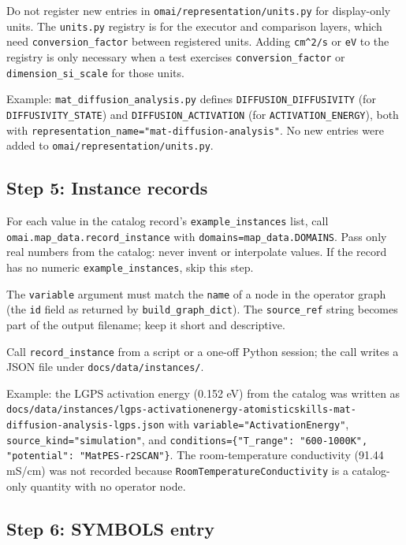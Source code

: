 \documentclass[11pt,a4paper]{article}
\begin{document}
Do not register new entries in \texttt{omai/representation/units.py} for
display-only units. The \texttt{units.py} registry is for the executor and
comparison layers, which need \texttt{conversion\_factor} between registered units.
Adding \texttt{cm\^{}2/s} or \texttt{eV} to the registry is only necessary when a
test exercises \texttt{conversion\_factor} or \texttt{dimension\_si\_scale} for
those units.

Example: \texttt{mat\_diffusion\_analysis.py} defines
\texttt{DIFFUSION\_DIFFUSIVITY} (for \texttt{DIFFUSIVITY\_STATE}) and
\texttt{DIFFUSION\_ACTIVATION} (for \texttt{ACTIVATION\_ENERGY}), both with
\texttt{representation\_name="mat-diffusion-analysis"}. No new entries were added to
\texttt{omai/representation/units.py}.

\subsection{Step 5: Instance records}

For each value in the catalog record's \texttt{example\_instances} list, call
\texttt{omai.map\_data.record\_instance} with \texttt{domains=map\_data.DOMAINS}.
Pass only real numbers from the catalog: never invent or interpolate values. If the
record has no numeric \texttt{example\_instances}, skip this step.

The \texttt{variable} argument must match the \texttt{name} of a node in the
operator graph (the \texttt{id} field as returned by \texttt{build\_graph\_dict}).
The \texttt{source\_ref} string becomes part of the output filename; keep it short
and descriptive.

Call \texttt{record\_instance} from a script or a one-off Python session; the call
writes a JSON file under \texttt{docs/data/instances/}.

Example: the LGPS activation energy (0.152 eV) from the catalog was written as
\texttt{docs/data/instances/}\allowbreak\texttt{lgps-activationenergy-}\allowbreak\texttt{atomisticskills-mat-}\allowbreak\texttt{diffusion-analysis-lgps.json}
with \texttt{variable="ActivationEnergy"}, \texttt{source\_kind="simulation"}, and
\texttt{conditions=\{"T\_range": "600-1000K", "potential": "MatPES-r2SCAN"\}}. The
room-temperature conductivity (91.44 mS/cm) was not recorded because
\texttt{RoomTemperatureConductivity} is a catalog-only quantity with no operator
node.

\subsection{Step 6: SYMBOLS entry}
\end{document}
